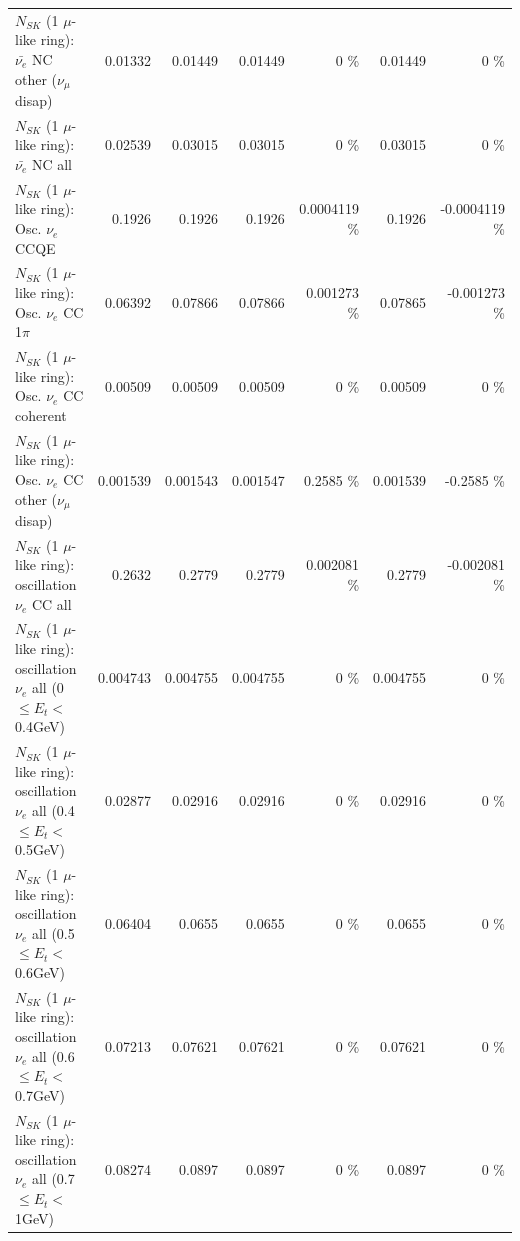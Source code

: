 \begin{table}
\begin{tabular}{| l | r | r | r  r | r  r |}
          $N_{SK}$ (1 $\mu$-like ring): $\bar{\nu_e}$ NC other ($\nu_\mu$ disap) &         0.01332 &         0.01449 &         0.01449 &        0 \%  &         0.01449 &        0 \%  \\ 
                            $N_{SK}$ (1 $\mu$-like ring): $\bar{\nu_{e}}$ NC all &         0.02539 &         0.03015 &         0.03015 &        0 \%  &         0.03015 &        0 \%  \\ 
\hline
\hline
\hline
                                 $N_{SK}$ (1 $\mu$-like ring): Osc. $\nu_e$ CCQE &          0.1926 &          0.1926 &          0.1926 & 0.0004119 \%  &          0.1926 & -0.0004119 \%  \\ 
                            $N_{SK}$ (1 $\mu$-like ring): Osc. $\nu_e$ CC 1$\pi$ &         0.06392 &         0.07866 &         0.07866 & 0.001273 \%  &         0.07865 & -0.001273 \%  \\ 
                          $N_{SK}$ (1 $\mu$-like ring): Osc. $\nu_e$ CC coherent &         0.00509 &         0.00509 &         0.00509 &        0 \%  &         0.00509 &        0 \%  \\ 
           $N_{SK}$ (1 $\mu$-like ring): Osc. $\nu_e$ CC other ($\nu_\mu$ disap) &        0.001539 &        0.001543 &        0.001547 &   0.2585 \%  &        0.001539 &  -0.2585 \%  \\ 
                        $N_{SK}$ (1 $\mu$-like ring): oscillation $\nu_e$ CC all &          0.2632 &          0.2779 &          0.2779 & 0.002081 \%  &          0.2779 & -0.002081 \%  \\ 
\hline
$N_{SK}$ (1 $\mu$-like ring): oscillation $\nu_{e}$ all (0 $\leq E_{t} <$ 0.4GeV) &        0.004743 &        0.004755 &        0.004755 &        0 \%  &        0.004755 &        0 \%  \\ 
$N_{SK}$ (1 $\mu$-like ring): oscillation $\nu_{e}$ all (0.4 $\leq E_{t} <$ 0.5GeV) &         0.02877 &         0.02916 &         0.02916 &        0 \%  &         0.02916 &        0 \%  \\ 
$N_{SK}$ (1 $\mu$-like ring): oscillation $\nu_{e}$ all (0.5 $\leq E_{t} <$ 0.6GeV) &         0.06404 &          0.0655 &          0.0655 &        0 \%  &          0.0655 &        0 \%  \\ 
$N_{SK}$ (1 $\mu$-like ring): oscillation $\nu_{e}$ all (0.6 $\leq E_{t} <$ 0.7GeV) &         0.07213 &         0.07621 &         0.07621 &        0 \%  &         0.07621 &        0 \%  \\ 
$N_{SK}$ (1 $\mu$-like ring): oscillation $\nu_{e}$ all (0.7 $\leq E_{t} <$ 1GeV) &         0.08274 &          0.0897 &          0.0897 &        0 \%  &          0.0897 &        0 \%  \\ 

\end{tabular}
\end{table}

